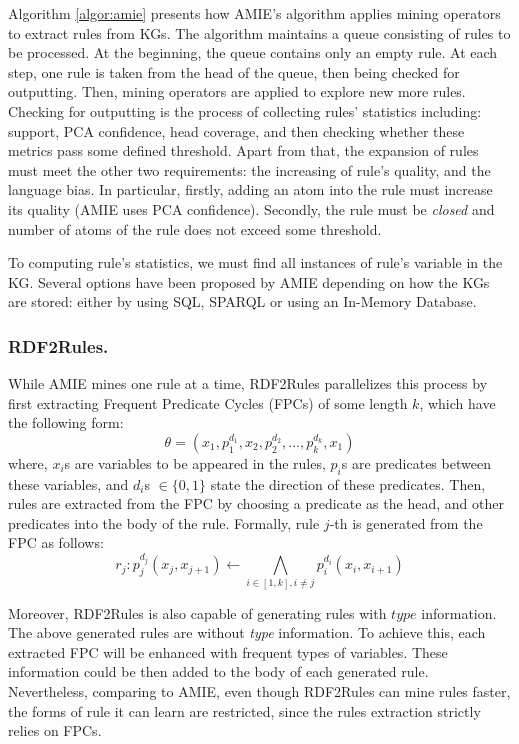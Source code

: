 Algorithm \ref{algor:amie} presents how AMIE's algorithm applies mining operators to extract rules from KGs. The algorithm maintains a queue consisting of rules to be processed. At the beginning, the queue contains only an empty rule. At each step, one rule is taken from the head of the queue, then being checked for outputting. Then, mining operators are applied to explore new more rules.
Checking for outputting is the process of collecting rules' statistics including: support, PCA confidence, head coverage, and then checking whether these metrics pass some defined threshold. Apart from that, the expansion of rules must meet the other two requirements: the increasing of rule's quality, and the language bias. In particular, firstly, adding an atom into the rule must increase its quality (AMIE uses PCA confidence). Secondly, the rule must be \textit{closed} and number of atoms of the rule does not exceed some threshold.

To computing rule's statistics, we must find all instances of rule's variable in the KG. Several options have been proposed by AMIE depending on how the KGs are stored: either by using SQL, SPARQL \cite{amie} or using an In-Memory Database.

\subsubsection{RDF2Rules.}
While AMIE mines one rule at a time, RDF2Rules \cite{rdf2rules} parallelizes this process by first extracting Frequent Predicate Cycles (FPCs) of some length $k$, which have the following form:
\[\theta = (x_1, p_1^{d_1}, x_2, p_2^{d_2}, ..., p_k^{d_k}, x_1)\]
where, $x_i$s are variables to be appeared in the rules, $p_i$s are predicates between these variables, and $d_i$s $\in \{0,1\}$ state the direction of these predicates. Then, rules are extracted from the FPC by choosing a predicate as the head, and other predicates into the body of the rule. Formally, rule $j$-th is generated from the FPC as follows:
\[r_j: p_j^{d_j}(x_j,x_{j+1}) \leftarrow \underset{i \in [1,k], i \ne j}{\bigwedge} p_i^{d_i}(x_i,x_{i+1}) \]

Moreover, RDF2Rules is also capable of generating rules with $type$ information. The above generated rules are without \textit{type} information. To achieve this, each extracted FPC will be enhanced with frequent types of variables. These information could be then added to the body of each generated rule. Nevertheless, comparing to AMIE, even though RDF2Rules can mine rules faster, the forms of rule it can learn are restricted, since the rules extraction strictly relies on FPCs.

